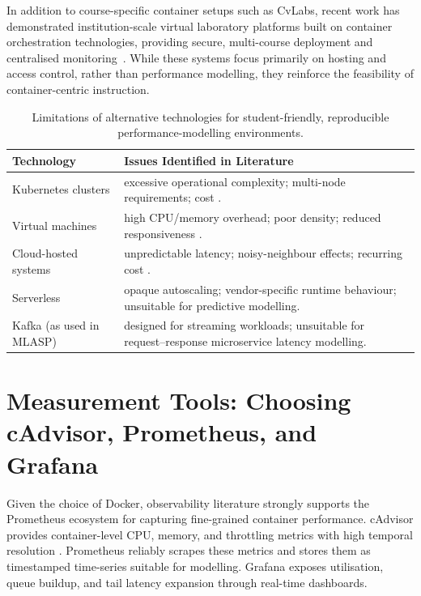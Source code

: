  In addition to course-specific container setups such as CvLabs, recent work has demonstrated institution-scale virtual laboratory platforms built on container orchestration technologies, providing secure, multi-course deployment and centralised monitoring~\cite{SecureScalableLab}. While these systems focus primarily on hosting and access control, rather than performance modelling, they reinforce the feasibility of container-centric instruction.

\begin{table}[h]
\centering
\begin{tabular}{l p{9cm}}
\hline
\textbf{Technology} & \textbf{Issues Identified in Literature} \\
\hline
Kubernetes clusters &
excessive operational complexity; multi-node requirements; cost
\cite{K8sPerfSurvey2019}. \\
Virtual machines &
high CPU/memory overhead; poor density; reduced responsiveness
\cite{HyperVVMWarestudies}. \\
Cloud-hosted systems &
unpredictable latency; noisy-neighbour effects; recurring cost
\cite{AzureAWSPerf}. \\
Serverless &
opaque autoscaling; vendor-specific runtime behaviour; unsuitable for 
predictive modelling. \\
Kafka (as used in MLASP) &
designed for streaming workloads; unsuitable for request--response
microservice latency modelling. \\
\hline
\end{tabular}
\caption{Limitations of alternative technologies for student-friendly, reproducible performance-modelling environments.}
\label{tab:alt_tech}
\end{table}


\section{Measurement Tools: Choosing cAdvisor, Prometheus, and Grafana}

Given the choice of Docker, observability literature strongly supports the
Prometheus ecosystem for capturing fine-grained container performance.
cAdvisor provides container-level CPU, memory, and throttling metrics with
high temporal resolution \cite{GooglecAdvisor}. Prometheus reliably
scrapes these metrics and stores them as timestamped time-series suitable
for modelling. Grafana exposes utilisation, queue buildup, and tail
latency expansion through real-time dashboards.

